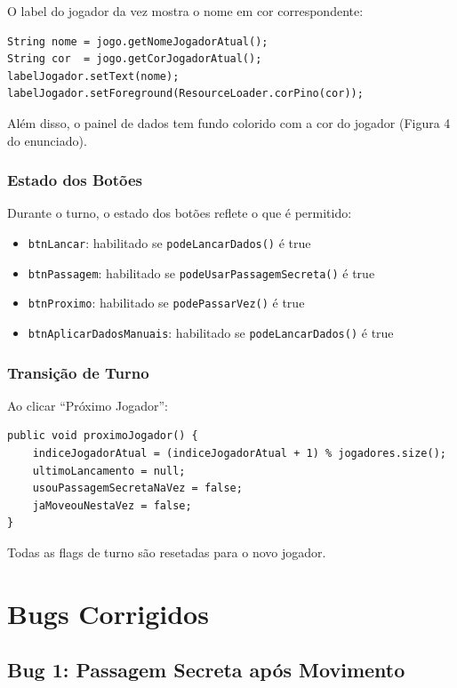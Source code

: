 \documentclass[12pt,a4paper]{report}
\begin{document}
O label do jogador da vez mostra o nome em cor correspondente:

\begin{lstlisting}
String nome = jogo.getNomeJogadorAtual();
String cor  = jogo.getCorJogadorAtual();
labelJogador.setText(nome);
labelJogador.setForeground(ResourceLoader.corPino(cor));
\end{lstlisting}

Além disso, o painel de dados tem fundo colorido com a cor do jogador (Figura 4 do enunciado).

\subsection{Estado dos Botões}

Durante o turno, o estado dos botões reflete o que é permitido:

\begin{itemize}
    \item \texttt{btnLancar}: habilitado se \texttt{podeLancarDados()} é true
    \item \texttt{btnPassagem}: habilitado se \texttt{podeUsarPassagemSecreta()} é true
    \item \texttt{btnProximo}: habilitado se \texttt{podePassarVez()} é true
    \item \texttt{btnAplicarDadosManuais}: habilitado se \texttt{podeLancarDados()} é true
\end{itemize}

\subsection{Transição de Turno}

Ao clicar ``Próximo Jogador'':

\begin{lstlisting}
public void proximoJogador() {
    indiceJogadorAtual = (indiceJogadorAtual + 1) % jogadores.size();
    ultimoLancamento = null;
    usouPassagemSecretaNaVez = false;
    jaMoveouNestaVez = false;
}
\end{lstlisting}

Todas as flags de turno são resetadas para o novo jogador.

\chapter{Bugs Corrigidos}

\section{Bug 1: Passagem Secreta após Movimento}
\end{document}

